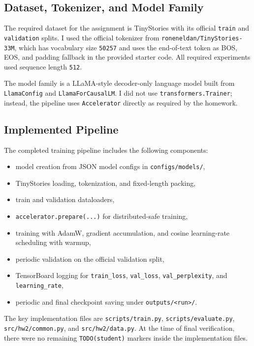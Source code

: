 \documentclass[11pt]{article}
\begin{document}
\subsection{Dataset, Tokenizer, and Model Family}

The required dataset for the assignment is TinyStories with its official \texttt{train} and \texttt{validation} splits. I used the official tokenizer from \texttt{roneneldan/TinyStories-33M}, which has vocabulary size \texttt{50257} and uses the end-of-text token as BOS, EOS, and padding fallback in the provided starter code. All required experiments used sequence length \texttt{512}.

The model family is a LLaMA-style decoder-only language model built from \texttt{LlamaConfig} and \texttt{LlamaForCausalLM}. I did not use \texttt{transformers.Trainer}; instead, the pipeline uses \texttt{Accelerator} directly as required by the homework.

\subsection{Implemented Pipeline}

The completed training pipeline includes the following components:

\begin{itemize}
  \item model creation from JSON model configs in \texttt{configs/models/},
  \item TinyStories loading, tokenization, and fixed-length packing,
  \item train and validation dataloaders,
  \item \texttt{accelerator.prepare(...)} for distributed-safe training,
  \item training with AdamW, gradient accumulation, and cosine learning-rate scheduling with warmup,
  \item periodic validation on the official validation split,
  \item TensorBoard logging for \texttt{train\_loss}, \texttt{val\_loss}, \texttt{val\_perplexity}, and \texttt{learning\_rate},
  \item periodic and final checkpoint saving under \texttt{outputs/<run>/}.
\end{itemize}

The key implementation files are \texttt{scripts/train.py}, \texttt{scripts/evaluate.py}, \texttt{src/hw2/common.py}, and \texttt{src/hw2/data.py}. At the time of final verification, there were no remaining \texttt{TODO(student)} markers inside the implementation files.
\end{document}
